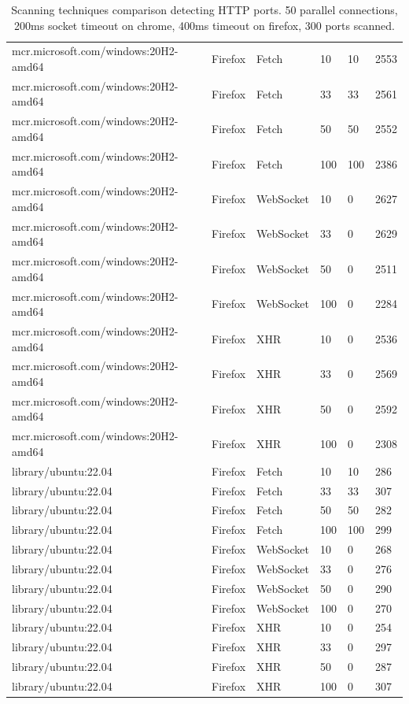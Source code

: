 \begin{table}[htbp]
\begin{adjustwidth}{-1.0cm}{}
\begin{tabular}{p{6.3cm}p{1.5cm}p{1.7cm}p{1cm}p{1.3cm}p{3cm}}
    \midrule
    mcr.microsoft.com/windows:20H2-amd64 & Firefox & Fetch & 10 & 10 & 2553 \\
    mcr.microsoft.com/windows:20H2-amd64 & Firefox & Fetch & 33 & 33 & 2561 \\
    mcr.microsoft.com/windows:20H2-amd64 & Firefox & Fetch & 50 & 50 & 2552 \\
    mcr.microsoft.com/windows:20H2-amd64 & Firefox & Fetch & 100 & 100 & 2386 \\
    \midrule
    mcr.microsoft.com/windows:20H2-amd64 & Firefox & WebSocket & 10 & 0 & 2627 \\
    mcr.microsoft.com/windows:20H2-amd64 & Firefox & WebSocket & 33 & 0 & 2629 \\
    mcr.microsoft.com/windows:20H2-amd64 & Firefox & WebSocket & 50 & 0 & 2511 \\
    mcr.microsoft.com/windows:20H2-amd64 & Firefox & WebSocket & 100 & 0 & 2284 \\
    \midrule
    mcr.microsoft.com/windows:20H2-amd64 & Firefox & XHR & 10 & 0 & 2536 \\
    mcr.microsoft.com/windows:20H2-amd64 & Firefox & XHR & 33 & 0 & 2569 \\
    mcr.microsoft.com/windows:20H2-amd64 & Firefox & XHR & 50 & 0 & 2592 \\
    mcr.microsoft.com/windows:20H2-amd64 & Firefox & XHR & 100 & 0 & 2308 \\
    \midrule
    library/ubuntu:22.04 & Firefox & Fetch & 10 & 10 & 286 \\
    library/ubuntu:22.04 & Firefox & Fetch & 33 & 33 & 307 \\
    library/ubuntu:22.04 & Firefox & Fetch & 50 & 50 & 282 \\
    library/ubuntu:22.04 & Firefox & Fetch & 100 & 100 & 299 \\
    \midrule
    library/ubuntu:22.04 & Firefox & WebSocket & 10 & 0 & 268 \\
    library/ubuntu:22.04 & Firefox & WebSocket & 33 & 0 & 276 \\
    library/ubuntu:22.04 & Firefox & WebSocket & 50 & 0 & 290 \\
    library/ubuntu:22.04 & Firefox & WebSocket & 100 & 0 & 270 \\
    \midrule
    library/ubuntu:22.04 & Firefox & XHR & 10 & 0 & 254 \\
    library/ubuntu:22.04 & Firefox & XHR & 33 & 0 & 297 \\
    library/ubuntu:22.04 & Firefox & XHR & 50 & 0 & 287 \\
    library/ubuntu:22.04 & Firefox & XHR & 100 & 0 & 307 \\
     \bottomrule
\end{tabular}
\end{adjustwidth}{}
\caption{Scanning techniques comparison detecting HTTP ports. 50 parallel connections, 200ms socket timeout on chrome, 400ms timeout on firefox, 300 ports scanned.}

\label{tab:scan-technique-comparison}
\end{table}

